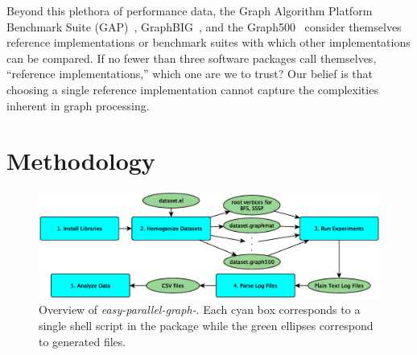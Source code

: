 \documentclass[conference]{IEEEtran}
\begin{document}
Beyond this plethora of performance data, the Graph Algorithm Platform Benchmark Suite (GAP)~\cite{Beamer:2015:GAPBench}, GraphBIG~\cite{Nai:2015:Graphbig}, and the Graph500~\cite{Murphy:2010:Graph500} consider themselves reference implementations or benchmark suites with which other implementations can be compared. If no fewer than three software packages call themselves, ``reference implementations,'' which one are we to trust? Our belief is that choosing a single reference implementation cannot capture the complexities inherent in graph processing.




\section{Methodology}

\begin{figure}
	\centering
	\includegraphics[width=\linewidth, trim=0 144pt 0pt 156pt, clip]{graphics/overview.eps}
	\caption{Overview of \emph{easy-parallel-graph-\textasteriskcentered}. Each cyan box corresponds to a single shell script in the package while the green ellipses correspond to generated files.}
	\label{fig:epg-overview}
\end{figure}
\end{document}
